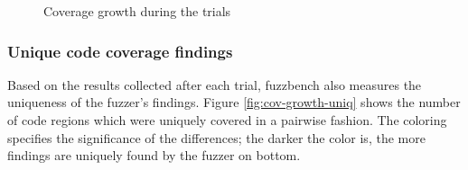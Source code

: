 \begin{figure}
    \caption{Coverage growth during the trials}
    \label{fig:cov-growth}
\end{figure}

\subsubsection{Unique code coverage findings}

Based on the results collected after each trial, fuzzbench also measures the uniqueness of the fuzzer's findings. Figure \ref{fig:cov-growth-uniq} shows the number of code regions which were uniquely covered in a pairwise fashion. The coloring specifies the significance of the differences; the darker the color is, the more findings are uniquely found by the fuzzer on bottom.


